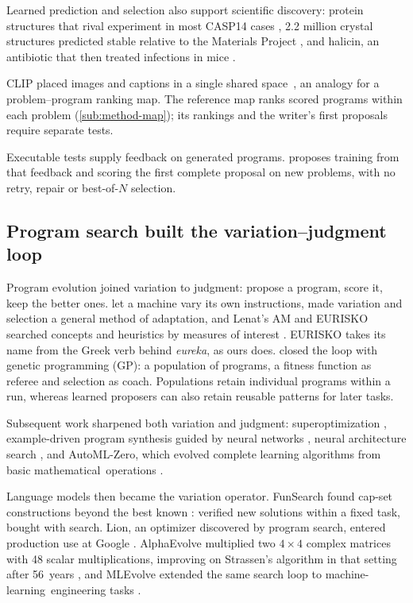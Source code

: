 Learned prediction and selection also support scientific discovery:
protein structures that rival experiment in most CASP14 cases
\citep{jumper2021alphafold},
2.2 million crystal structures predicted stable relative to the Materials Project
\citep{merchant2023gnome}, and
halicin, an antibiotic that then treated infections in mice
\citep{stokes2020halicin}.

CLIP placed images and captions in a single shared \mbox{space
\citep{radford2021clip},} an analogy for a problem--program ranking map.
The reference map ranks scored programs within each problem
(\cref{sub:method-map}); its rankings and the writer's first proposals
require separate tests.

Executable tests supply feedback on generated programs. \EZ{} proposes
training from that feedback and scoring the first complete proposal on
new problems, with no retry, repair or best-of-$N$ selection.

\subsection{Program search built the variation--judgment loop}\label{sub:road-programs}

Program evolution joined variation to judgment: propose a program, score
it, keep the better ones. \citet{friedberg1958learning} let a machine vary
its own instructions, \citet{holland1975adaptation} made variation and
selection a general method of adaptation, and Lenat's AM and EURISKO
searched concepts and heuristics by measures of interest
\citep{lenat1976am,lenat1983eurisko}. EURISKO takes its name from the Greek
verb behind \emph{eureka}, as ours does. \citet{koza1992genetic} closed the
loop with genetic programming (GP): a population of programs, a fitness function
as referee and selection as coach. Populations retain individual programs within a run, whereas learned
proposers can also retain reusable patterns for later tasks.

Subsequent work sharpened both variation and judgment: superoptimization
\citep{massalin1987superoptimizer}, example-driven program synthesis
\citep{gulwani2011flashfill} guided by neural networks
\citep{balog2017deepcoder}, neural architecture search \citep{zoph2017nas},
and AutoML-Zero, which evolved complete learning algorithms from basic \mbox{mathematical
operations} \citep{real2020automlzero}.

Language models then became the
variation operator. FunSearch found cap-set constructions beyond the best
known \citep{romeraparedes2024funsearch}: verified new solutions within a
fixed task, bought with search. Lion, an optimizer discovered by program
search, entered production use at Google \citep{chen2023lion}. AlphaEvolve
multiplied two $4\times4$ complex matrices with 48 scalar multiplications,
improving on Strassen's algorithm in that setting after \mbox{56 years}
\citep{novikov2025alphaevolve}, and MLEvolve extended the same search loop to
\mbox{machine-learning engineering} tasks \citep{mlevolve2026}.

